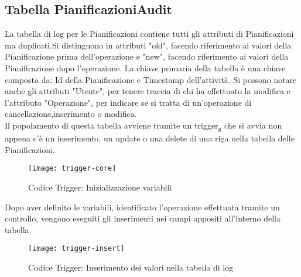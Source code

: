 \subsection{Tabella PianificazioniAudit}
La tabella di log per le Pianificazioni contiene tutti gli attributi di Pianificazioni ma duplicati.Si distinguono in attributi "old", facendo riferimento ai valori della Pianificazione prima dell'operazione e "new", facendo riferimento ai valori della Pianificazione dopo l'operazione. La chiave primaria della tabella è una chiave composta da: Id della Pianificazione e Timestamp dell'attività. Si possono notare anche gli attributi "Utente", per tenere traccia di chi ha effettuato la modifica e l'attributo "Operazione", per indicare se si tratta di un'operazione di cancellazione,inserimento o modifica.\\
Il popolamento di questa tabella avviene tramite un trigger\textsubscript{g} che si avvia non appena c'è un inserimento, un update o una delete di una riga nella tabella delle Pianificazioni.
\begin{figure}[H] 
    \centering 
    \texttt{[image: trigger-core]} 
    \caption{Codice Trigger: Inizializzazione variabili}
\end{figure}
\noindent Dopo aver definito le variabili, identificato l'operazione effettuata tramite un controllo, vengono eseguiti gli inserimenti nei campi appositi all'interno della tabella.
\begin{figure}[H] 
    \centering 
    \texttt{[image: trigger-insert]} 
    \caption{Codice Trigger: Inserimento dei valori nella tabella di log}
\end{figure}



